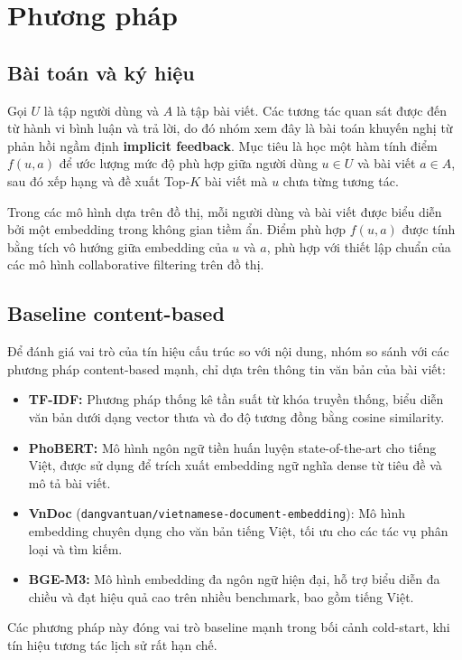 \documentclass[11pt]{article}
\begin{document}
\section{Phương pháp}
\label{sec:method}

\subsection{Bài toán và ký hiệu}
Gọi $U$ là tập người dùng và $A$ là tập bài viết.
Các tương tác quan sát được đến từ hành vi bình luận và trả lời,
do đó nhóm xem đây là bài toán khuyến nghị từ phản hồi ngầm định \textbf{implicit feedback}.
Mục tiêu là học một hàm tính điểm $f(u,a)$
để ước lượng mức độ phù hợp giữa người dùng $u \in U$ và bài viết $a \in A$,
sau đó xếp hạng và đề xuất Top-$K$ bài viết mà $u$ chưa từng tương tác.

Trong các mô hình dựa trên đồ thị,
mỗi người dùng và bài viết được biểu diễn bởi một embedding trong không gian tiềm ẩn.
Điểm phù hợp $f(u,a)$ được tính bằng tích vô hướng giữa embedding của $u$ và $a$,
phù hợp với thiết lập chuẩn của các mô hình collaborative filtering trên đồ thị.

\subsection{Baseline content-based}
Để đánh giá vai trò của tín hiệu cấu trúc so với nội dung,
nhóm so sánh với các phương pháp content-based mạnh,
chỉ dựa trên thông tin văn bản của bài viết:
\begin{itemize}
    \item \textbf{TF-IDF:} Phương pháp thống kê tần suất từ khóa truyền thống,
          biểu diễn văn bản dưới dạng vector thưa và đo độ tương đồng bằng cosine similarity.
    \item \textbf{PhoBERT:} Mô hình ngôn ngữ tiền huấn luyện state-of-the-art cho tiếng Việt,
          được sử dụng để trích xuất embedding ngữ nghĩa dense từ tiêu đề và mô tả bài viết.
    \item \textbf{VnDoc} (\texttt{dangvantuan/vietnamese-document-embedding}): Mô hình embedding chuyên dụng cho văn bản tiếng Việt,
          tối ưu cho các tác vụ phân loại và tìm kiếm.
    \item \textbf{BGE-M3:} Mô hình embedding đa ngôn ngữ hiện đại,
          hỗ trợ biểu diễn đa chiều và đạt hiệu quả cao trên nhiều benchmark, bao gồm tiếng Việt.
\end{itemize}
Các phương pháp này đóng vai trò baseline mạnh trong bối cảnh cold-start,
khi tín hiệu tương tác lịch sử rất hạn chế.
\end{document}
